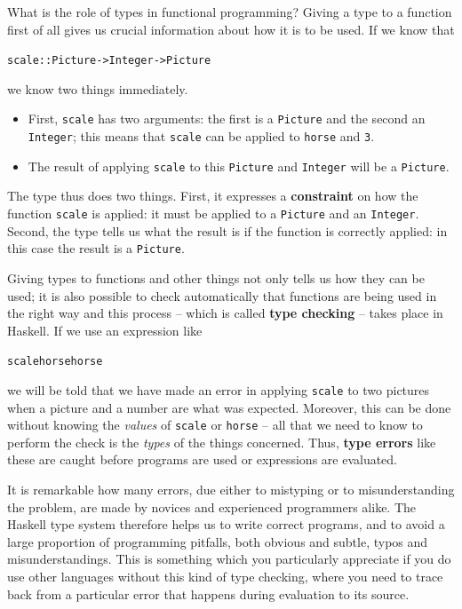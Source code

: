 What is the role of types in functional programming? Giving a type to a
function first of all gives us crucial information about how it is to be
used. If we know that
\begin{alltt}
scale :: Picture -> Integer -> Picture
\end{alltt}
we know two things immediately.
\begin{itemize}
\item First, \texttt{scale} has two arguments: the first is a
\texttt{Picture} and the second an \texttt{Integer}; this means that
\texttt{scale} can be applied to \texttt{horse} and \texttt{3}.
\item The result of applying \texttt{scale} to this \texttt{Picture} and \texttt{Integer}
will be a \texttt{Picture}.
\end{itemize}
The type thus does two things. First, it expresses a
\textbf{constraint} on how the
function \texttt{scale} is applied: it must be applied 
to a \texttt{Picture} and an \texttt{Integer}. Second, the type tells us
what the result is if the function is correctly applied: in this case
the result is a \texttt{Picture}.

Giving types to functions and other things not only tells us how they
can be used; it is also possible to check automatically that functions
are being used in the right way and this process -- which is called
\textbf{type checking} -- takes place in Haskell. If we
use an expression like 
\begin{alltt}
scale horse horse
\end{alltt}
we will be told that we have made an error in applying \texttt{scale} to
two pictures
when a picture and a number are what was expected. Moreover, this can be done without knowing
the {\em values\/} of \texttt{scale} or \texttt{horse} -- all that we need to know 
to perform the check is the {\em types\/} of the things concerned.
Thus, \textbf{type errors} like these 
are caught before programs are used or expressions
are evaluated.

It is remarkable how
many errors, due either to mistyping or to misunderstanding the problem, are made
by novices and experienced programmers alike.  The Haskell type system
therefore helps us to write correct programs, and to avoid a large proportion 
of programming pitfalls, both 
obvious and subtle, typos and misunderstandings. This is something which you particularly appreciate if you do use other languages without this kind of type checking, where you need to trace back from a particular error that happens during evaluation to its source.

